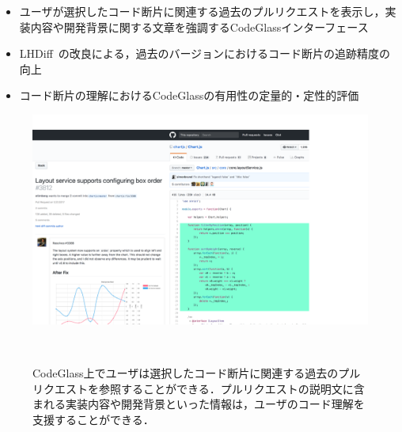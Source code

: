 
\begin{itemize}
\item ユーザが選択したコード断片に関連する過去のプルリクエストを表示し，実装内容や開発背景に関する文章を強調するCodeGlassインターフェース
\item LHDiff~\cite{LHDiff}の改良による，過去のバージョンにおけるコード断片の追跡精度の向上
\item コード断片の理解におけるCodeGlassの有用性の定量的・定性的評価
\end{itemize}




\begin{figure}[!t]
\centering
\includegraphics[width=1.2\columnwidth]{interface/top_image.png}
\caption{CodeGlass上でユーザは選択したコード断片に関連する過去のプルリクエストを参照することができる．プルリクエストの説明文に含まれる実装内容や開発背景といった情報は，ユーザのコード理解を支援することができる．}
~\label{fig:top}
\end{figure}


